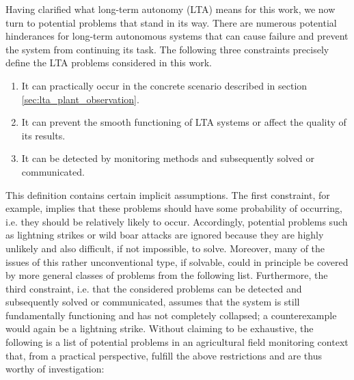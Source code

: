 \documentclass[english, master, utf8]{base/thesis_KBS}
\begin{document}
Having clarified what long-term autonomy (LTA) means for this work, we now turn to potential problems that stand in its way.
There are numerous potential hinderances for long-term autonomous systems that can cause failure and prevent the system from continuing its task.
The following three constraints precisely define the LTA problems considered in this work.
\begin{enumerate}
    \item It can practically occur in the concrete scenario described in section \ref{sec:lta_plant_observation}.
    \item It can prevent the smooth functioning of LTA systems or affect the quality of its results.
    \item It can be detected by monitoring methods and subsequently solved or communicated.
\end{enumerate}
This definition contains certain implicit assumptions. The first constraint, for example, implies that these problems should have some probability of occurring,
i.e. they should be relatively likely to occur. Accordingly, potential problems such as lightning strikes or wild boar attacks are ignored because they are highly 
unlikely and also difficult, if not impossible, to solve. Moreover, many of the issues of this rather unconventional type, if solvable, could in principle be covered
by more general classes of problems from the following list. Furthermore, the third constraint, i.e. that the considered problems can be detected and subsequently solved 
or communicated, assumes that the system is still fundamentally functioning and has not completely collapsed; a counterexample would again be a lightning strike.
Without claiming to be exhaustive, the following is a list of potential problems in an agricultural field monitoring context that, 
from a practical perspective, fulfill the above restrictions and are thus worthy of investigation:
\end{document}
